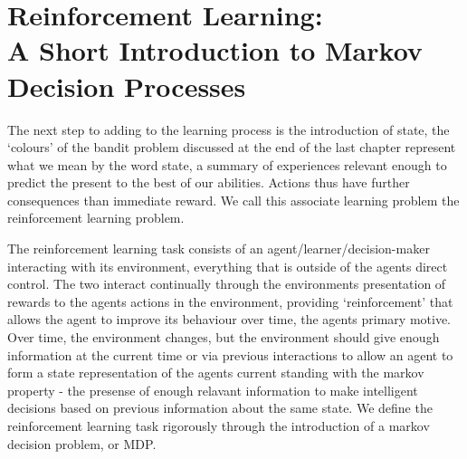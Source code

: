\documentclass{report}
\begin{document}
\chapter{Reinforcement Learning:\\A Short Introduction to Markov Decision Processes}

The next step to adding to the learning process is the introduction of state, the `colours' of the bandit problem discussed at the end of the last chapter represent what we mean by the word state, a summary of experiences relevant enough to predict the present to the best of our abilities. Actions thus have further consequences than immediate reward. We call this associate learning problem the reinforcement learning problem.

The reinforcement learning task consists of an agent/learner/decision-maker interacting with its environment, everything that is outside of the agents direct control. The two interact continually through the environments presentation of rewards to the agents actions in the environment, providing `reinforcement' that allows the agent to improve its behaviour over time, the agents primary motive. Over time, the environment changes, but the environment should give enough information at the current time or via previous interactions to allow an agent to form a state representation of the agents current standing with the markov property - the presense of enough relavant information to make intelligent decisions based on previous information about the same state. We define the reinforcement learning task rigorously through the introduction of a markov decision problem, or MDP.
\end{document}
